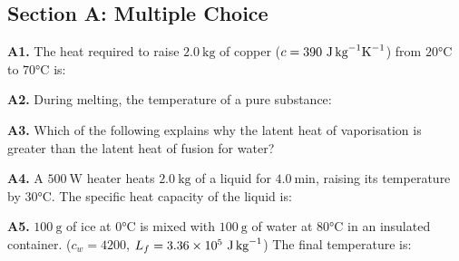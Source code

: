 \newpage
\begin{exercisebox}[15]

\subsection*{Section A: Multiple Choice}

\textbf{A1.} The heat required to raise $2.0\ \text{kg}$
of copper ($c = 390\ \text{J\,kg}^{-1}\text{K}^{-1}$)
from $20°\text{C}$ to $70°\text{C}$ is:


\vspace{0.4cm}

\textbf{A2.} During melting, the temperature of a
pure substance:


\vspace{0.4cm}

\textbf{A3.} Which of the following explains why
the latent heat of vaporisation is greater than the
latent heat of fusion for water?


\vspace{0.4cm}

\textbf{A4.} A $500\ \text{W}$ heater heats
$2.0\ \text{kg}$ of a liquid for $4.0\ \text{min}$,
raising its temperature by $30°\text{C}$. The
specific heat capacity of the liquid is:


\vspace{0.4cm}

\textbf{A5.} $100\ \text{g}$ of ice at $0°\text{C}$
is mixed with $100\ \text{g}$ of water at $80°\text{C}$
in an insulated container.
($c_w = 4200$, $L_f = 3.36\times10^5\ \text{J\,kg}^{-1}$)
The final temperature is:


\end{exercisebox}
